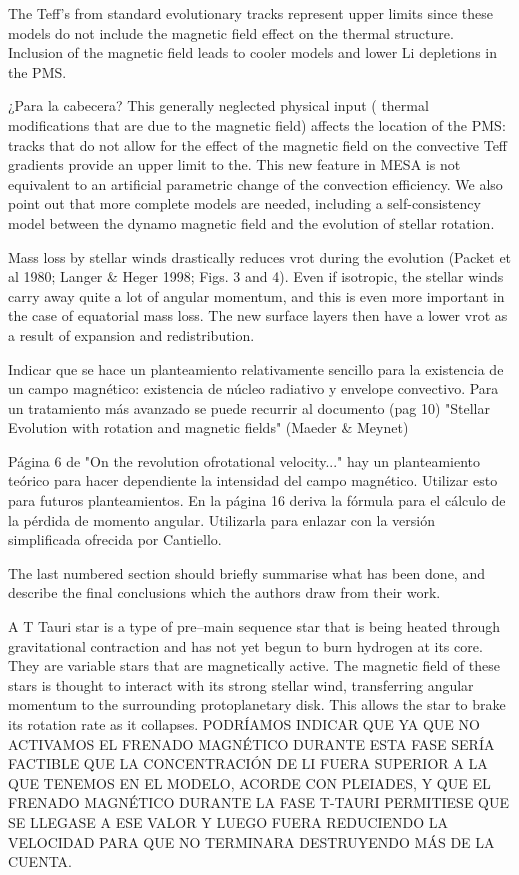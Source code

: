 \documentclass[fleqn,usenatbib]{mnras}
\begin{document}
The Teff’s from standard evolutionary tracks represent upper limits since these models do not include the magnetic field effect on the thermal structure.
Inclusion of the magnetic field leads to cooler models and lower Li depletions in the PMS. 

¿Para la cabecera?
This generally neglected physical input ( thermal modifications that are due to the magnetic field) affects the location of the PMS: tracks that do not allow for the effect of the magnetic field on the convective Teff gradients provide an upper limit to the.
This new feature in MESA is not equivalent to an artificial parametric change of the convection efficiency.
We also point out that more complete models are needed, including a self-consistency model between the dynamo
magnetic field and the evolution of stellar rotation.

Mass loss by stellar winds drastically reduces vrot during the evolution (Packet
et al 1980; Langer \& Heger 1998; Figs. 3 and 4). Even if isotropic, the stellar winds carry away quite a lot of angular momentum, and this is even more important in the case of equatorial mass loss. The new surface layers then have a lower vrot as a result of expansion and redistribution.



Indicar que se hace un planteamiento relativamente sencillo para la existencia de un campo magnético: existencia de núcleo radiativo y envelope convectivo. Para un tratamiento más avanzado se puede recurrir al documento (pag 10) "Stellar Evolution with rotation and magnetic fields" (Maeder \& Meynet)

Página 6 de "On the revolution ofrotational velocity..." hay un planteamiento teórico para hacer dependiente la intensidad del campo magnético. Utilizar esto para futuros planteamientos. En la página 16 deriva la fórmula para el cálculo de la pérdida de momento angular. Utilizarla para enlazar con la versión simplificada ofrecida por Cantiello.



The last numbered section should briefly summarise what has been done, and describe
the final conclusions which the authors draw from their work.

A T Tauri star is a type of pre–main sequence star that is being heated through gravitational contraction and has not yet begun to burn hydrogen at its core. They are variable stars that are magnetically active. The magnetic field of these stars is thought to interact with its strong stellar wind, transferring angular momentum to the surrounding protoplanetary disk. This allows the star to brake its rotation rate as it collapses. PODRÍAMOS INDICAR QUE YA QUE NO ACTIVAMOS EL FRENADO MAGNÉTICO DURANTE ESTA FASE SERÍA FACTIBLE QUE LA CONCENTRACIÓN DE LI FUERA SUPERIOR A LA QUE TENEMOS EN EL MODELO, ACORDE CON PLEIADES, Y QUE EL FRENADO MAGNÉTICO DURANTE LA FASE T-TAURI PERMITIESE QUE SE LLEGASE A ESE VALOR Y LUEGO FUERA REDUCIENDO LA VELOCIDAD PARA QUE NO TERMINARA DESTRUYENDO MÁS DE LA CUENTA.
\end{document}
